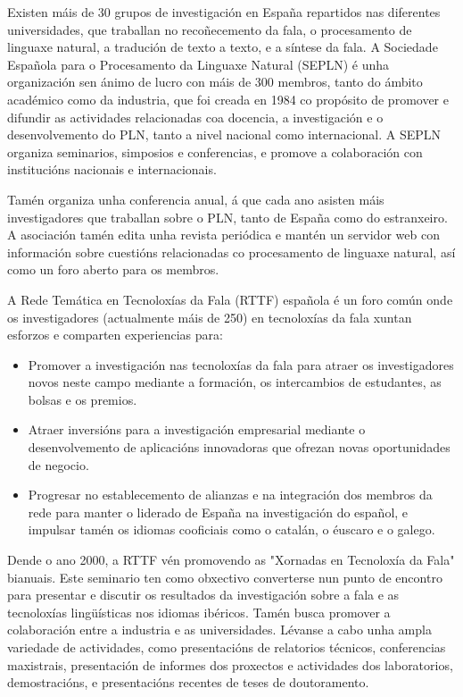 \begin{multicols}{2}
Existen máis de 30 grupos de investigación en España repartidos nas diferentes universidades, que traballan no recoñecemento da fala, o procesamento de linguaxe natural, a tradución de texto a texto, e a síntese da fala. A Sociedade Española para o Procesamento da Linguaxe Natural (SEPLN) é unha organización sen ánimo de lucro con máis de 300 membros, tanto do ámbito académico como da industria, que foi creada en 1984 co propósito de promover e difundir as actividades relacionadas coa docencia, a investigación e o desenvolvemento do PLN, tanto a nivel nacional como internacional. A SEPLN organiza seminarios, simposios e conferencias, e promove a colaboración con institucións nacionais e internacionais.


Tamén organiza unha conferencia anual, á que cada ano asisten máis investigadores que traballan sobre o PLN, tanto de España como do estranxeiro. A asociación tamén edita unha revista periódica e mantén un servidor web con información sobre cuestións relacionadas co procesamento de linguaxe natural, así como un foro aberto para os membros.

A Rede Temática en Tecnoloxías da Fala (RTTF) española \cite{GAL-Nota34} é un foro común onde os investigadores (actualmente máis de 250) en tecnoloxías da fala xuntan esforzos e comparten experiencias para:

\begin{itemize}
	\item Promover a investigación nas tecnoloxías da fala para atraer os investigadores novos neste campo mediante a formación, os intercambios de estudantes, as bolsas e os premios.
	\item Atraer inversións para a investigación empresarial mediante o desenvolvemento de aplicacións innovadoras que ofrezan novas oportunidades de negocio. 
	\item Progresar no establecemento de alianzas e na integración dos membros da rede para manter o liderado de España na investigación do español, e impulsar tamén os idiomas cooficiais como o catalán, o éuscaro e o galego.
\end{itemize}

Dende o ano 2000, a RTTF vén promovendo as "Xornadas en Tecnoloxía da Fala" bianuais. Este seminario ten como obxectivo converterse nun punto de encontro para presentar e discutir os resultados da investigación sobre a fala e as tecnoloxías lingüísticas nos idiomas ibéricos. Tamén busca promover a colaboración entre a industria e as universidades. Lévanse a cabo unha ampla variedade de actividades, como presentacións de relatorios técnicos, conferencias maxistrais, presentación de informes dos proxectos e actividades dos laboratorios, demostracións, e presentacións recentes de teses de doutoramento.


\end{multicols}

